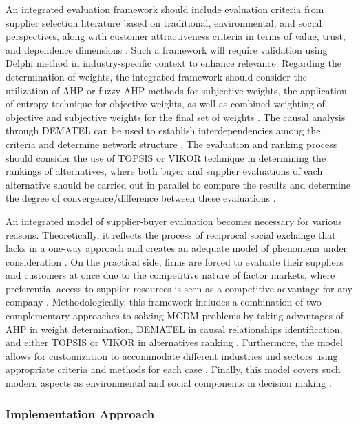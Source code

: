 \documentclass[11pt]{article}
\begin{document}
An integrated evaluation framework should include evaluation criteria from supplier selection literature based on traditional, environmental, and social perspectives, along with customer attractiveness criteria in terms of value, trust, and dependence dimensions \cite{ref22,ref32}. Such a framework will require validation using Delphi method in industry-specific context to enhance relevance. Regarding the determination of weights, the integrated framework should consider the utilization of AHP or fuzzy AHP methods for subjective weights, the application of entropy technique for objective weights, as well as combined weighting of objective and subjective weights for the final set of weights \cite{ref36}. The causal analysis through DEMATEL can be used to establish interdependencies among the criteria and determine network structure \cite{ref24,ref31}. The evaluation and ranking process should consider the use of TOPSIS or VIKOR technique in determining the rankings of alternatives, where both buyer and supplier evaluations of each alternative should be carried out in parallel to compare the results and determine the degree of convergence/difference between these evaluations \cite{ref27,ref31}.


An integrated model of supplier-buyer evaluation becomes necessary for various reasons. Theoretically, it reflects the process of reciprocal social exchange that lacks in a one-way approach and creates an adequate model of phenomena under consideration \cite{ref33,ref14}. On the practical side, firms are forced to evaluate their suppliers and customers at once due to the competitive nature of factor markets, where preferential access to supplier resources is seen as a competitive advantage for any company \cite{ref32,ref34}. Methodologically, this framework includes a combination of two complementary approaches to solving MCDM problems by taking advantages of AHP in weight determination, DEMATEL in causal relationships identification, and either TOPSIS or VIKOR in alternatives ranking \cite{ref35,ref36}. Furthermore, the model allows for customization to accommodate different industries and sectors using appropriate criteria and methods for each case \cite{ref30,ref35}. Finally, this model covers such modern aspects as environmental and social components in decision making \cite{ref27,ref29}.

\subsubsection{Implementation Approach}
\end{document}
